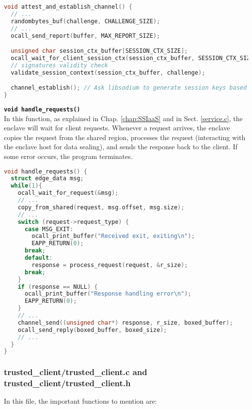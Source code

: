 \begin{lstlisting}[language=C,frame=single]
void attest_and_establish_channel() {
  // ...  
  randombytes_buf(challenge, CHALLENGE_SIZE);
  // ...  
  ocall_send_report(buffer, MAX_REPORT_SIZE);

  unsigned char session_ctx_buffer[SESSION_CTX_SIZE];
  ocall_wait_for_client_session_ctx(session_ctx_buffer, SESSION_CTX_SIZE);
  // signatures validity check
  validate_session_context(session_ctx_buffer, challenge); 

  channel_establish(); // Ask libsodium to generate session keys based on the received pk
} 
\end{lstlisting}
\newpage
\noindent
\texttt{\bfseries void handle\_requests()}\\
In this function, as explained in Chap. \ref{chap:SSIaaS} and in Sect. \ref{service.c}, the enclave will wait for client requests. Whenever a request arrives, the enclave copies the request from the shared region, processes the request (interacting with the enclave host for data sealing), and sends the response back to the client. If some error occurs, the program terminates. \\

\begin{lstlisting}[language=C,frame=single]
void handle_requests() {
  struct edge_data msg;
  while(1){
    ocall_wait_for_request(&msg);
    // ...
    copy_from_shared(request, msg.offset, msg.size);
    // ...
    switch (request->request_type) {
      case MSG_EXIT:
        ocall_print_buffer("Received exit, exiting\n");
        EAPP_RETURN(0);
      break;
      default:
        response = process_request(request, &r_size);
      break;
    }
    if (response == NULL) {
      ocall_print_buffer("Response handling error\n");
      EAPP_RETURN(0);
    }
    // ...
    channel_send((unsigned char*) response, r_size, boxed_buffer);
    ocall_send_reply(boxed_buffer, boxed_size);
    // ... 
  }
}
\end{lstlisting}
    




\newpage
\subsubsection{trusted\_client/trusted\_client.c and trusted\_client/trusted\_client.h}
In this file, the important functions to mention are:

